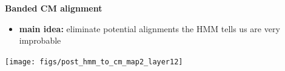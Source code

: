 \documentclass[landscape]{slides}
\begin{document}
\begin{slide}
\begin{center}
\large
\textbf{Banded CM alignment}
\end{center}
\medskip
\small
\begin{itemize}
\item
\textbf{main idea:} eliminate potential alignments the HMM tells us are very improbable
\end{itemize}
\begin{center}
\texttt{[image: figs/post\_hmm\_to\_cm\_map2\_layer12]}
\end{center}
\vfill
\end{slide}
\end{document}
